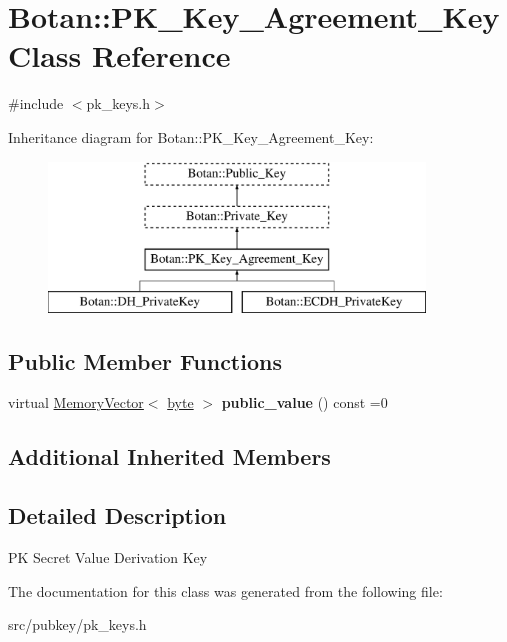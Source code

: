 \hypertarget{classBotan_1_1PK__Key__Agreement__Key}{\section{Botan\-:\-:P\-K\-\_\-\-Key\-\_\-\-Agreement\-\_\-\-Key Class Reference}
\label{classBotan_1_1PK__Key__Agreement__Key}
}


{\ttfamily \#include $<$pk\-\_\-keys.\-h$>$}

Inheritance diagram for Botan\-:\-:P\-K\-\_\-\-Key\-\_\-\-Agreement\-\_\-\-Key\-:\begin{figure}[H]
\begin{center}
\leavevmode
\includegraphics[height=4.000000cm]{classBotan_1_1PK__Key__Agreement__Key}
\end{center}
\end{figure}
\subsection*{Public Member Functions}
\begin{DoxyCompactItemize}
\item 
\hypertarget{classBotan_1_1PK__Key__Agreement__Key_ab1b84baf416ee5a110fecd602462eb4f}{virtual \hyperlink{classBotan_1_1MemoryVector}{Memory\-Vector}$<$ \hyperlink{namespaceBotan_a7d793989d801281df48c6b19616b8b84}{byte} $>$ {\bfseries public\-\_\-value} () const =0}\label{classBotan_1_1PK__Key__Agreement__Key_ab1b84baf416ee5a110fecd602462eb4f}

\end{DoxyCompactItemize}
\subsection*{Additional Inherited Members}


\subsection{Detailed Description}
P\-K Secret Value Derivation Key 

The documentation for this class was generated from the following file\-:\begin{DoxyCompactItemize}
\item 
src/pubkey/pk\-\_\-keys.\-h\end{DoxyCompactItemize}
